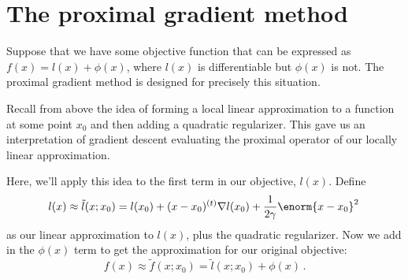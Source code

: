 \documentclass{article}
\begin{document}


\section{The proximal gradient method}

Suppose that we have some objective function that can be expressed as $f(x) = l(x) + \phi(x)$, where $l(x)$ is differentiable but $\phi(x)$ is not.  The proximal gradient method is designed for precisely this situation.

Recall from above the idea of forming a local linear approximation to a function at some point $x_0$ and then adding a quadratic regularizer.  This gave us an interpretation of gradient descent evaluating the proximal operator of our locally linear approximation.

Here, we'll apply this idea to the first term in our objective, $l(x)$. Define
$$
l(x) \approx \tilde{l}(x; x_0) = l(x_0) + (x - x_0)^{(t)} \nabla l(x_0) + \frac{1}{2\gamma} \enorm{x - x_0}^2 \, 
$$
as our linear approximation to $l(x)$, plus the quadratic regularizer.  Now we add in the $\phi(x)$ term to get the approximation for our original objective:
\begin{equation}
\label{eqn:pg_approx}
f(x) \approx \tilde{f}(x; x_0) = \tilde{l}(x; x_0) + \phi(x)   \, .
\end{equation}
\end{document}
